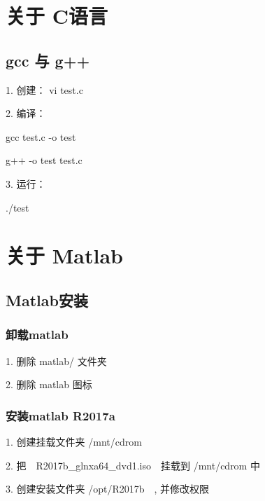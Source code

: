 \documentclass[12pt,a4paper]{article}
\begin{document}
\section{关于 C语言}

\subsection{gcc 与 g++}

1. 创建： vi test.c

2. 编译： 

\qquad gcc test.c -o test

\qquad g++ -o test test.c

3. 运行：

\qquad ./test


\section{关于 Matlab}

\subsection{Matlab安装}

\subsubsection{卸载matlab}

1. 删除 matlab/ 文件夹


2. 删除 matlab 图标


\subsubsection{安装matlab R2017a}

1. 创建挂载文件夹 /mnt/cdrom
 

2. 把　R2017b\_glnxa64\_dvd1.iso　挂载到 /mnt/cdrom 中
 

3. 创建安装文件夹 /opt/R2017b　, 并修改权限


\end{document}
